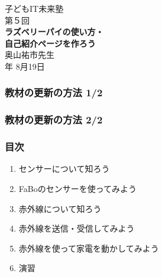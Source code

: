 \begin{frame}[fragile]
   \begin{center}
    \huge{子どもIT未来塾}\\

    \vspace{48pt}
	   \Large{第５回}\\
	   {\huge\bf ラズベリーパイの使い方・\\
	   \huge\bf 自己紹介ページを作ろう}\\
    \vspace{24pt}
    \large{奥山祐市先生}\\
    \vspace{10pt}
    \large{\the\year 年 8月19日}
  \end{center}
\end{frame}

\begin{frame}
    \frametitle{教材の更新の方法 1/2}
\end{frame}

\begin{frame}[fragile]
    \frametitle{教材の更新の方法 2/2}
\end{frame}

\begin{frame}[fragile]
    \frametitle{目次}
    \begin{enumerate}
        \item センサーについて知ろう
        \item FaBoのセンサーを使ってみよう
        \item 赤外線について知ろう
        \item 赤外線を送信・受信してみよう
        \item 赤外線を使って家電を動かしてみよう
        \item 演習
    \end{enumerate}
\end{frame}
